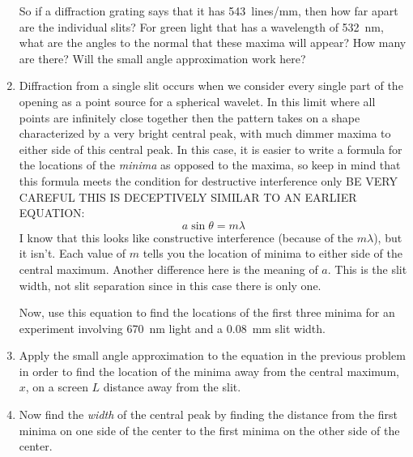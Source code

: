 \begin{enumerate}
So if a diffraction grating says that it has \SI{543}{lines/mm}, then how far apart are the individual slits? For green light that has a wavelength of \SI{532}{nm}, what are the angles to the normal that these maxima will appear? How many are there? Will the small angle approximation work here?


\item
Diffraction from a single slit occurs when we consider every single part of the opening as a point source for a spherical wavelet. In this limit where all points are infinitely close together then the pattern takes on a shape characterized by a very bright central peak, with much dimmer maxima to either side of this central peak. In this case, it is easier to write a formula for the locations of the \emph{minima} as opposed to the maxima, so keep in mind that this formula meets the condition for destructive interference only BE VERY CAREFUL THIS IS DECEPTIVELY SIMILAR TO AN EARLIER EQUATION: 
\[a \sin \theta = m \lambda\]
I know that this looks like constructive interference (because of the $m \lambda$), but it isn't. Each value of $m$ tells you the location of minima to either side of the central maximum. Another difference here is the meaning of $a$. This is the slit width, not slit separation since in this case there is only one.

Now, use this equation to find the locations of the first three minima for an experiment involving \SI{670}{nm} light and a \SI{0.08}{mm} slit width.

\item
Apply the small angle approximation to the equation in the previous problem in order to find the location of the minima away from the central maximum, $x$, on a screen $L$ distance away from the slit.

\item
Now find the \emph{width} of the central peak by finding the distance from the first minima on one side of the center to the first minima on the other side of the center.



\newpage 

\ %

\newpage

\end{enumerate}